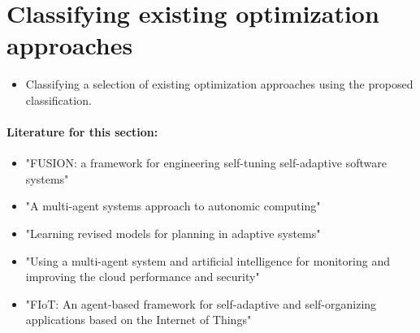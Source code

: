 \newpage
\section{Classifying existing optimization approaches}
\label{ch:Existing}

\begin{itemize}
    \item Classifying a selection of existing optimization approaches using the proposed classification.
\end{itemize}

\paragraph*{Literature for this section:} \begin{itemize}
    \item "FUSION: a framework for engineering self-tuning self-adaptive software systems" \cite{10.1145/1882291.1882296}
    \item "A multi-agent systems approach to autonomic computing" \cite{tesauro2004multi}
    \item "Learning revised models for planning in adaptive systems" \cite{6606552}
    \item "Using a multi-agent system and artificial intelligence for monitoring and improving the cloud performance and security" \cite{GRZONKA20181106}
    \item "FIoT: An agent-based framework for self-adaptive and self-organizing applications based on the Internet of Things" \cite{DONASCIMENTO2017161}
\end{itemize}